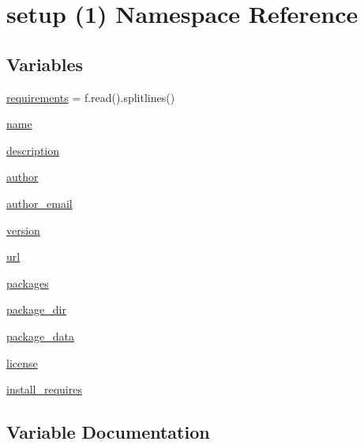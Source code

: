 \hypertarget{namespacesetup_01_071_08}{}\section{setup (1) Namespace Reference}
\label{namespacesetup_01_071_08}
\subsection*{Variables}
\begin{DoxyCompactItemize}
\item 
\hyperlink{namespacesetup_01_071_08_aae5f59f06402b79899f58170ca7c3abb}{requirements} = f.\+read().splitlines()
\item 
\hyperlink{namespacesetup_01_071_08_ab74e6bf80237ddc4109968cedc58c151}{name}
\item 
\hyperlink{namespacesetup_01_071_08_a2661f439a4a94ffdcd5e47ae1da0bb1d}{description}
\item 
\hyperlink{namespacesetup_01_071_08_ad50afb6ec7b2501164b80a0480596ded}{author}
\item 
\hyperlink{namespacesetup_01_071_08_aa0684bedaf8c5c409060306e443a7742}{author\+\_\+email}
\item 
\hyperlink{namespacesetup_01_071_08_a4c7a521b8f1a0769c09bfa4a1fca7dab}{version}
\item 
\hyperlink{namespacesetup_01_071_08_afcd5a3e84f2adb7f83fa6c99911f31e4}{url}
\item 
\hyperlink{namespacesetup_01_071_08_a5191bfd75a28371588f75471591d5500}{packages}
\item 
\hyperlink{namespacesetup_01_071_08_a831b74f0aec5de1cb7b526c3de2c12ed}{package\+\_\+dir}
\item 
\hyperlink{namespacesetup_01_071_08_a3082807deecba7a5edc23253ddfb584f}{package\+\_\+data}
\item 
\hyperlink{namespacesetup_01_071_08_a4e659be027e258b72df12349200a263e}{license}
\item 
\hyperlink{namespacesetup_01_071_08_a047d4e9f7b152e767f7bd459218fe1fd}{install\+\_\+requires}
\end{DoxyCompactItemize}


\subsection{Variable Documentation}
\mbox{\label{namespacesetup_01_071_08_ad50afb6ec7b2501164b80a0480596ded}} 
